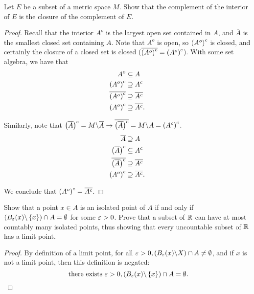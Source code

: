 \documentclass{exam}
\begin{document}
\begin{questions}
    \newpage
    \question Let $E$ be a subset of a metric space $M$. Show that the complement of the interior of $E$ is the closure of
    the complement of $E$.
    \begin{proof}
        Recall that the interior $A^o$ is the largest open set contained in $A$, and $\overline{A}$ is the smallest closed set containing $A$.
        Note that $A^o$ is open, so $\left( A^o \right)^c$ is closed, and certainly the closure of a closed set is closed 
        ($\overline{\left( A^o \right)^c} = \left( A^o \right)^c$). With some set algebra, we have that
        \begin{align*}
            A^o &\subseteq A \\
            \left( A^o \right)^c &\supseteq A^c \\
            \overline{\left( A^o \right)^c} & \supseteq \overline{A^c} \\
            \left( A^o \right)^c &\supseteq \overline{A^c}.
        \end{align*}

        Similarly, note that $\left( \overline{A} \right)^c = M\backslash\overline{A} \rightarrow \overline{\left( \overline{A} \right)^c} = M\backslash A = \left( A^o \right)^c$.
        \begin{align*}
            \overline{A} &\supseteq A \\
            \left( \overline{A} \right)^c &\subseteq A^c \\
            \overline{\left( \overline{A} \right)^c} &\supseteq \overline{A^c} \\
            \left( A^o \right)^c &\supseteq \overline{A^c}.
        \end{align*}

        We conclude that $\left( A^o \right)^c = \overline{A^c}$.
    \end{proof}


    \newpage
    \question Show that a point $x\in A$ is an isolated point of $A$ if and only if $\left( B_\varepsilon (x)\backslash\left \{ x \right \} \right)\cap A = \emptyset$ 
    for some $\varepsilon > 0$. Prove that a subset of $\mathbb {R}$ can have at most countably many isolated points, thus showing that every uncountable
    subset of $\mathbb {R}$ has a limit point.
    \begin{proof}
        By definition of a limit point, for all $\varepsilon > 0, \left( B_\varepsilon (x)\backslash{X} \right)\cap A \neq \emptyset$, and if $x$ is not
        a limit point, then this definition is negated:
        $$\text{ there exists }\varepsilon > 0, \left( B_\varepsilon (x)\backslash\left \{ x \right \} \right)\cap A = \emptyset.$$


\end{proof}
\end{questions}
\end{document}
